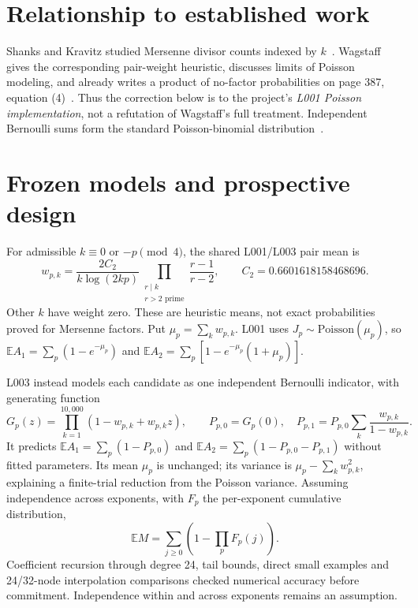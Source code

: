 \documentclass[11pt,a4paper]{article}
\newcommand{\E}{\mathbb{E}}
\begin{document}
\section{Relationship to established work}
Shanks and Kravitz studied Mersenne divisor counts indexed by $k$~\cite{sk}.
Wagstaff gives the corresponding pair-weight heuristic, discusses limits of
Poisson modeling, and already writes a product of no-factor probabilities
on page 387, equation (4)~\cite{wagstaff}. Thus the correction below is to
the project's \emph{L001 Poisson implementation}, not a refutation of
Wagstaff's full treatment. Independent Bernoulli sums form the standard
Poisson-binomial distribution~\cite{hong}.

\newpage
\section{Frozen models and prospective design}
For admissible $k\equiv0$ or $-p\pmod4$, the shared L001/L003 pair mean is
\begin{equation}
 w_{p,k}=\frac{2C_2}{k\log(2kp)}
 \prod_{\substack{r\mid k\\r>2\text{ prime}}}\frac{r-1}{r-2},
 \qquad C_2=0.6601618158468696.
\end{equation}
Other $k$ have weight zero. These are heuristic means, not exact
probabilities proved for Mersenne factors. Put $\mu_p=\sum_kw_{p,k}$.
L001 uses $J_p\sim\mathrm{Poisson}(\mu_p)$, so
$\E A_1=\sum_p(1-e^{-\mu_p})$ and
$\E A_2=\sum_p[1-e^{-\mu_p}(1+\mu_p)]$.

L003 instead models each candidate as one independent Bernoulli indicator,
with generating function
\begin{equation}
 G_p(z)=\prod_{k=1}^{10{,}000}(1-w_{p,k}+w_{p,k}z),\qquad
 P_{p,0}=G_p(0),\quad
 P_{p,1}=P_{p,0}\sum_k\frac{w_{p,k}}{1-w_{p,k}}.
\end{equation}
It predicts $\E A_1=\sum_p(1-P_{p,0})$ and
$\E A_2=\sum_p(1-P_{p,0}-P_{p,1})$ without fitted parameters.
Its mean $\mu_p$ is unchanged; its variance is
$\mu_p-\sum_kw_{p,k}^2$, explaining a finite-trial reduction from the
Poisson variance. Assuming independence across exponents, with $F_p$ the
per-exponent cumulative distribution,
\begin{equation}
 \E M=\sum_{j\ge0}\left(1-\prod_p F_p(j)\right).
\end{equation}
Coefficient recursion through degree 24, tail bounds, direct small examples
and 24/32-node interpolation comparisons checked numerical accuracy before
commitment. Independence within and across exponents remains an assumption.
\end{document}
